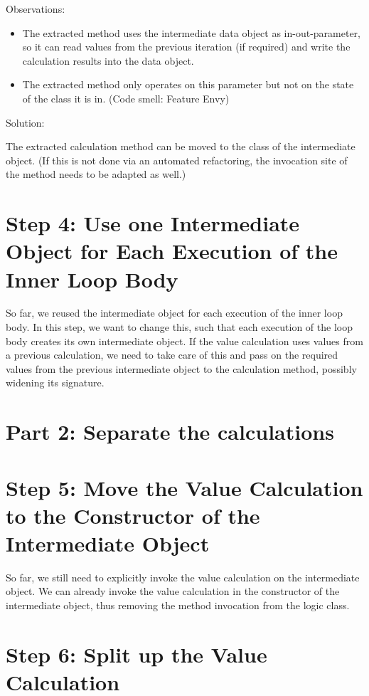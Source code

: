 \documentclass[a4paper,fleqn,titlepage,11pt]{article}
\begin{document}
Observations:
\begin{itemize}
\item The extracted method uses the intermediate data object as in-out-parameter, so it can read values from the previous iteration (if required) and write the calculation results into the data object.
\item The extracted method only operates on this parameter but not on the state of the class it is in. (Code smell: Feature Envy)
\end{itemize}

Solution:

The extracted calculation method can be moved to the class of the intermediate object. (If this is not done via an automated refactoring, the invocation site of the method needs to be adapted as well.)


\section{Step 4: Use one Intermediate Object for Each Execution of the Inner Loop Body}

So far, we reused the intermediate object for each execution of the inner loop body. In this step, we want to change this, such that each execution of the loop body creates its own intermediate object. If the value calculation uses values from a previous calculation, we need to take care of this and pass on the required values from the previous intermediate object to the calculation method, possibly widening its signature.

\section{Part 2: Separate the calculations}


\section{Step 5: Move the Value Calculation to the Constructor of the Intermediate Object}

So far, we still need to explicitly invoke the value calculation on the intermediate object. We can already invoke the value calculation in the constructor of the intermediate object, thus removing the method invocation from the logic class.

\section{Step 6: Split up the Value Calculation}
\end{document}
